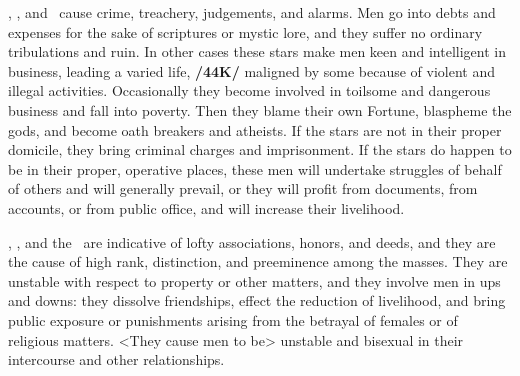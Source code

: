 \Saturn, \Mars, and \Mercury\, cause crime, treachery, judgements, and alarms. Men go into debts and expenses for the sake of scriptures or mystic lore, and they suffer no ordinary tribulations and ruin. In other cases these stars make men keen and intelligent in business, leading a varied life, \textbf{/44K/} maligned by some because of violent and illegal activities. Occasionally they become involved in toilsome and dangerous business and fall into poverty. Then they blame their own Fortune, blaspheme the gods, and become oath breakers and atheists. If the stars are not in their proper domicile, they bring criminal charges and imprisonment. If the stars do happen to be in their proper, operative places, these men will undertake struggles of behalf of others and will generally prevail, or they will profit from documents, from accounts, or from public office, and will increase their livelihood.

\Saturn, \Venus, and the \Sun\, are indicative of lofty associations, honors, and deeds, and they are the cause of high rank, distinction, and preeminence among the masses. They are unstable with respect to property or other matters, and they involve men in ups and downs: they dissolve friendships, effect the reduction of livelihood, and bring public exposure or punishments arising from the betrayal of females or of religious matters. <They cause men to be> unstable and bisexual in their intercourse and other relationships.

